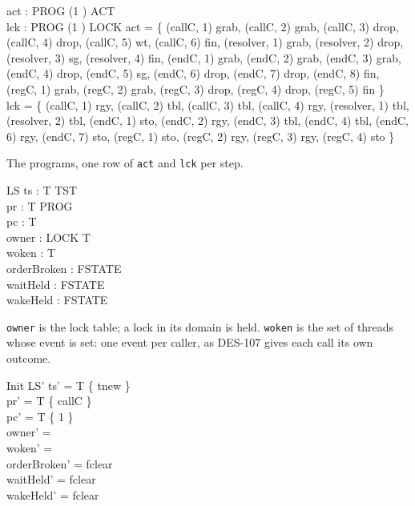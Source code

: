 \documentclass[a4paper,10pt,fleqn]{article}
\begin{document}
\begin{axdef}
  act : PROG \cross (1 ) \pfun ACT \\
  lck : PROG \cross (1 ) \pfun LOCK
\where
  act = \{ (callC, 1) \mapsto grab, (callC, 2) \mapsto grab,
    (callC, 3) \mapsto drop, (callC, 4) \mapsto drop, (callC, 5) \mapsto wt,
    (callC, 6) \mapsto fin,
    (resolver, 1) \mapsto grab, (resolver, 2) \mapsto drop,
    (resolver, 3) \mapsto sg, (resolver, 4) \mapsto fin,
    (endC, 1) \mapsto grab, (endC, 2) \mapsto grab, (endC, 3) \mapsto grab,
    (endC, 4) \mapsto drop, (endC, 5) \mapsto sg, (endC, 6) \mapsto drop,
    (endC, 7) \mapsto drop, (endC, 8) \mapsto fin,
    (regC, 1) \mapsto grab, (regC, 2) \mapsto grab, (regC, 3) \mapsto drop,
    (regC, 4) \mapsto drop, (regC, 5) \mapsto fin \} \\
  lck = \{ (callC, 1) \mapsto rgy, (callC, 2) \mapsto tbl,
    (callC, 3) \mapsto tbl, (callC, 4) \mapsto rgy,
    (resolver, 1) \mapsto tbl, (resolver, 2) \mapsto tbl,
    (endC, 1) \mapsto sto, (endC, 2) \mapsto rgy, (endC, 3) \mapsto tbl,
    (endC, 4) \mapsto tbl, (endC, 6) \mapsto rgy, (endC, 7) \mapsto sto,
    (regC, 1) \mapsto sto, (regC, 2) \mapsto rgy, (regC, 3) \mapsto rgy,
    (regC, 4) \mapsto sto \}
\end{axdef}

The programs, one row of \texttt{act} and \texttt{lck} per step.

\begin{schema}{LS}
  ts : T \fun TST \\
  pr : T \fun PROG \\
  pc : T   \\
  owner : LOCK \pfun T \\
  woken : \power T \\
  orderBroken : FSTATE \\
  waitHeld : FSTATE \\
  wakeHeld : FSTATE
\end{schema}

\texttt{owner} is the lock table; a lock in its domain is held.
\texttt{woken} is the set of threads whose event is set: one event per
caller, as DES-107 gives each call its own outcome.

\begin{schema}{Init}
  LS'
\where
  ts' = T \cross \{ tnew \} \\
  pr' = T \cross \{ callC \} \\
  pc' = T \cross \{ 1 \} \\
  owner' = \emptyset \\
  woken' = \emptyset \\
  orderBroken' = fclear \\
  waitHeld' = fclear \\
  wakeHeld' = fclear
\end{schema}
\end{document}
